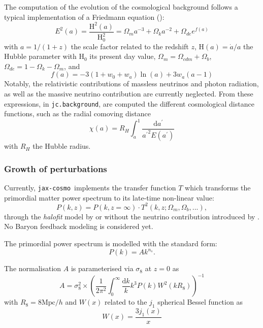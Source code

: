 \documentclass[twocolumn,twocolappendix,nofootinbib,iop]{openjournal}
\newcommand{\jaxcosmo}{\texttt{jax-cosmo}}
\begin{document}
The computation of the evolution of the cosmological background follows a typical implementation of a Friedmann equation (\citealp[see e.g.][]{2005A&A...443..819P}):
\begin{equation}
    E^2(a) = \frac{\mathrm{H}^2(a)}{\mathrm{H}^2_0} = \Omega_m a^{-3} + \Omega_k a^{-2} + \Omega_{de} e^{f(a)}
\end{equation}
with $a=1/(1+z)$ the scale factor related to the redshift $z$, $\mathrm{H}(a)=\dot{a}/a$ the Hubble parameter with $\mathrm{H}_0$ its present day value, $\Omega_m= \Omega_{cdm}+\Omega_b$, $\Omega_{de}=1-\Omega_k-\Omega_m$, and 
\begin{equation}
    f(a) = -3 (1 + w_0 + w_a) \ln(a) + 3 w_a (a - 1)
\end{equation}
Notably, the relativistic contributions of massless neutrinos and photon radiation, as well as the massive neutrino contribution are currently neglected. From these expressions, in \texttt{jc.background}, are computed the different cosmological distance functions, such as the radial comoving distance
\begin{equation}
     \chi(a) =  R_H \int_a^1 \frac{\mathrm{d}a^\prime}{{a^\prime}^2 E(a^\prime)}
     \label{eq:radial_comoving}
\end{equation}
with $R_H$ the Hubble radius. 
%
\subsubsection{Growth of perturbations}
%
Currently, \jaxcosmo\  implements the \citet{Eisenstein_1998} transfer function $T$ which transforms the primordial matter power spectrum to its late-time non-linear value:
\begin{equation}
    P(k, z) = P(k, z=\infty) \cdot T^2(k, z; \Omega_m, \Omega_b, ...),
\end{equation}
through the \textit{halofit} model by \cite{2012ApJ...761..152T} or \cite{2003MNRAS.341.1311S} without the neutrino contribution introduced by \cite{10.1111/j.1365-2966.2011.20222.x}. No Baryon feedback modeling is considered yet. 

The primordial power spectrum is modelled with the standard form:
\begin{equation}
    P(k) = A k^{n_s}.
\end{equation}

The normalisation $A$ is parameterised via $\sigma_8$ at $z=0$ as 
\begin{equation}
    A = \sigma_8^2 \times \left(\frac{1}{2 \pi^2} \int_0^\infty \frac{\mathrm{d}k}{k} k^3 P(k) W^2(kR_8) \right)^{-1}
\end{equation}
with $R_8 = 8 \mathrm{Mpc}/h$ and $W(x)$ related to the $j_1$ spherical Bessel function as
\begin{equation}
    W(x) = \frac{3j_1(x)}{x}
\end{equation}
\end{document}
